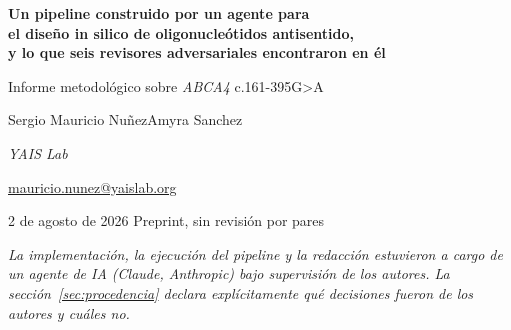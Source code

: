 \documentclass[11pt,a4paper]{article}
\begin{document}
\thispagestyle{empty}
\begin{center}
  \vspace*{0.6cm}

  {\LARGE\bfseries Un pipeline construido por un agente para\\[0.15em]
   el diseño in silico de oligonucleótidos antisentido,\\[0.25em]
   y lo que seis revisores adversariales encontraron en él\par}

  \vspace{0.8em}
  {\large Informe metodológico sobre \emph{ABCA4} c.161-395G>A\par}

  \vspace{1.6em}
  {\large Sergio Mauricio Nu\~nez\qquad Amyra Sanchez\par}
  \vspace{0.4em}
  {\small \emph{YAIS Lab}\par}
  \vspace{0.2em}
  {\small \href{mailto:mauricio.nunez@yaislab.org}{mauricio.nunez@yaislab.org}\par}

  \vspace{0.9em}
  {\small 2 de agosto de 2026 \quad\textbullet\quad Preprint, sin revisión por pares\par}
\end{center}

\vspace{0.8em}

\begin{center}
\begin{minipage}{0.88\linewidth}\small\itshape
La implementación, la ejecución del pipeline y la redacción estuvieron a cargo de un
agente de IA (Claude, Anthropic) bajo supervisión de los autores. La
sección~\ref{sec:procedencia} declara explícitamente qué decisiones fueron de los
autores y cuáles no.
\end{minipage}
\end{center}
\end{document}

